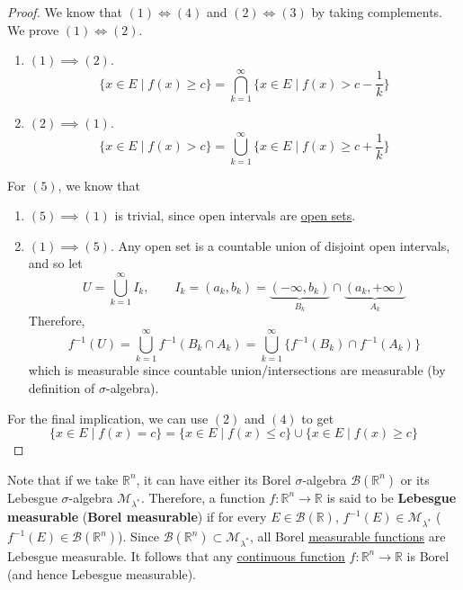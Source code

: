   \begin{proof}
    We know that $(1) \iff (4)$ and $(2) \iff (3)$ by taking complements. We prove $(1) \iff (2)$. 
    \begin{enumerate}
      \item $(1) \implies (2)$. 
      \begin{equation}
        \{x \in E \mid f(x) \geq c \} = \bigcap_{k=1}^\infty \{x \in E \mid f(x) > c - \frac{1}{k} \}
      \end{equation}

      \item $(2) \implies (1)$. 
      \begin{equation}
        \{ x \in E \mid f(x) > c\} = \bigcup_{k=1}^\infty \{x \in E \mid f(x) \geq c + \frac{1}{k} \}
      \end{equation}
    \end{enumerate}

    For $(5)$, we know that
    \begin{enumerate}
      \item $(5) \implies (1)$ is trivial, since open intervals are \hyperref[pst-def:open-set]{open sets}. 
      \item $(1) \implies (5)$. Any open set is a countable union of disjoint open intervals, and so let 
      \begin{equation}
        U = \bigcup_{k=1}^\infty I_k, \qquad I_k = (a_k, b_k) = \underbrace{(-\infty, b_k)}_{B_k} \cap \underbrace{(a_k, +\infty)}_{A_k}
      \end{equation} 
      Therefore, 
      \begin{equation}
        f^{-1} (U) = \bigcup_{k=1}^\infty f^{-1} (B_k \cap A_k) = \bigcup_{k=1}^\infty \{f^{-1} (B_k) \cap f^{-1} (A_k) \}
      \end{equation}
      which is measurable since countable union/intersections are measurable (by definition of $\sigma$-algebra). 
    \end{enumerate}

    For the final implication, we can use $(2)$ and $(4)$ to get 
    \begin{equation}
      \{x \in E \mid f(x) = c\} = \{x \in E \mid f(x) \leq c \} \cup \{x \in E \mid f(x) \geq c \}
    \end{equation}
  \end{proof} 

  Note that if we take $\mathbb{R}^n$, it can have either its Borel $\sigma$-algebra $\mathcal{B}(\mathbb{R}^n)$ or its Lebesgue $\sigma$-algebra $\mathcal{M}_{\lambda^*}$. Therefore, a function $f: \mathbb{R}^n \to \mathbb{R}$ is said to be \textbf{Lebesgue measurable} (\textbf{Borel measurable}) if for every $E \in \mathcal{B}(\mathbb{R})$, $f^{-1}(E) \in \mathcal{M}_{\lambda^*}$ ($f^{-1}(E) \in \mathcal{B}(\mathbb{R}^n)$). Since $\mathcal{B}(\mathbb{R}^n) \subset \mathcal{M}_{\lambda^*}$, all Borel \hyperref[def:measurable-function]{measurable functions} are Lebesgue measurable. It follows that any \hyperref[pst-def:continuous_func]{continuous function} $f: \mathbb{R}^n \to \mathbb{R}$ is Borel (and hence Lebesgue measurable). 

